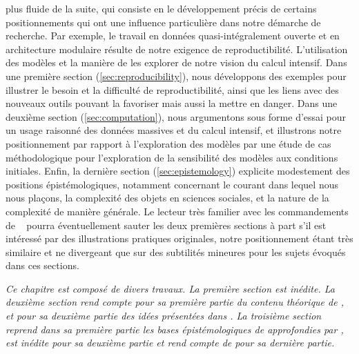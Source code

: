 plus fluide de la suite, qui consiste en le développement précis de certains positionnements qui ont une influence particulière dans notre démarche de recherche. Par exemple, le travail en données quasi-intégralement ouverte et en architecture modulaire résulte de notre exigence de reproductibilité. L'utilisation des modèles et la manière de les explorer de notre vision du calcul intensif. Dans une première section (\ref{sec:reproducibility}), nous développons des exemples pour illustrer le besoin et la difficulté de reproductibilité, ainsi que les liens avec des nouveaux outils pouvant la favoriser mais aussi la mettre en danger. Dans une deuxième section (\ref{sec:computation}), nous argumentons sous forme d'essai pour un usage raisonné des données massives et du calcul intensif, et illustrons notre positionnement par rapport à l'exploration des modèles par une étude de cas méthodologique pour l'exploration de la sensibilité des modèles aux conditions initiales. Enfin, la dernière section (\ref{sec:epistemology}) explicite modestement des positions épistémologiques, notamment concernant le courant dans lequel nous nous plaçons, la complexité des objets en sciences sociales, et la nature de la complexité de manière générale. Le lecteur très familier avec les commandements de ~\cite{banos2013pour} pourra éventuellement sauter les deux premières sections à part s'il est intéressé par des illustrations pratiques originales, notre positionnement étant très similaire et ne divergeant que sur des subtilités mineures pour les sujets évoqués dans ces sections.




\stars


\textit{Ce chapitre est composé de divers travaux. La première section est inédite. La deuxième section rend compte pour sa première partie du contenu théorique de \cite{raimbault2016cautious}, et pour sa deuxième partie des idées présentées dans \cite{cottineau2017initial}. La troisième section reprend dans sa première partie les bases épistémologiques de \cite{raimbault:halshs-01505084} approfondies par \cite{raimbault2017knowledge}, est inédite pour sa deuxième partie et rend compte de \cite{raimbault2017complex} pour sa dernière partie.
}







